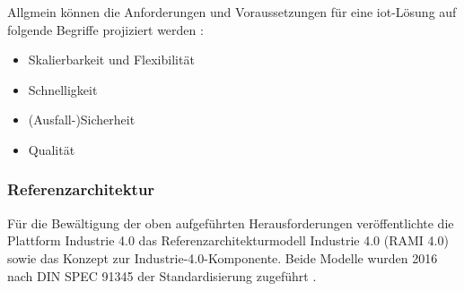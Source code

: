 Allgmein können die Anforderungen und Voraussetzungen für eine \ac{iot}-Lösung auf folgende Begriffe projiziert werden \citep{Acharya2019}:

\begin{itemize}
  \item Skalierbarkeit und Flexibilität
  \item Schnelligkeit
  \item (Ausfall-)Sicherheit
  \item Qualität
\end{itemize}

\subsubsection{Referenzarchitektur}\label{rami}

Für die Bewältigung der oben aufgeführten Herausforderungen veröffentlichte die Plattform Industrie 4.0 das \glqq Referenzarchitekturmodell Industrie 4.0\grqq{} (RAMI 4.0) sowie das Konzept zur \glqq Industrie-4.0-Komponente\grqq{}. Beide Modelle wurden 2016 nach DIN SPEC 91345 der Standardisierung zugeführt \citep{Beuth2016}.

